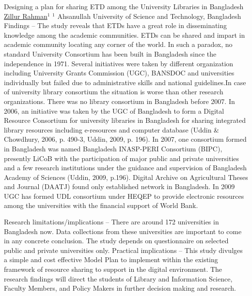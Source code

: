 \begin{abstract_online}{Designing a plan for sharing ETD among the University Libraries in Bangladesh}{%
    \underline{Zillur Rahman}$^{1}$}{%
    }{%
    $^1$ Ahsanullah University of Science and Technology, Bangladesh
}
         Findings – The study reveals that ETDs have a great role in disseminating knowledge among the academic communities. ETDs can be shared and impart in academic community locating any corner of the world. In such a paradox, no standard University Consortium has been built in Bangladesh since the independence in 1971. Several initiatives were taken by different organization including University Grants Commission (UGC), BANSDOC and universities individually but failed due to administrative skills and national guidelines.In case of university library consortium the situation is worse than other research organizations. There was no library consortium in Bangladesh before 2007. In 2006, an initiative was taken by the UGC of Bangladesh to form a Digital Resource Consortium for university libraries in Bangladesh for sharing integrated library resources including e-resources and computer database (Uddin & Chowdhury, 2006, p. 490-3, Uddin, 2009, p. 196). In 2007, one consortium formed in Bangladesh was named Bangladesh INASP-PERI Consortium (BIPC), presently LiCoB with the participation of major public and private universities and a few research institutions under the guidance and supervision of Bangladesh Academy of Sciences (Uddin, 2009, p.196). Digital Archive on Agricultural Theses and Journal (DAATJ) found only established network in Bangladesh.  In 2009 UGC has formed UDL consortium under HEQEP to provide electronic resources among the universities with the financial support of World Bank.   
       
         Research limitations/implications – There are around 172 universities in Bangladesh now. Data collections from these universities are important to come in any concrete conclusion. The study depends on questionnaire on selected public and private universities only.  Practical implications – This study divulges a simple and cost effective Model Plan to implement within the existing framework of resource sharing to support in the digital environment. The research findings will direct the students of Library and Information Science, Faculty Members, and Policy Makers in further decision making and research. 
    \end{abstract_online}
    
